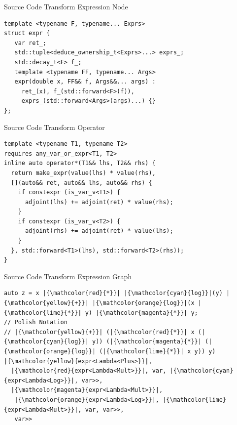 \documentclass[dvipsnames, aspectratio=169]{beamer}
\makeatletter
\def\mathcolor#1#{\@mathcolor{#1}}
\def\@mathcolor#1#2#3{%
  \protect\leavevmode
  \begingroup
    \color#1{#2}#3%
  \endgroup
}
\makeatother
\begin{document}
\begin{frame}[fragile]{Source Code Transform Expression Node}
\begin{verbatim}
template <typename F, typename... Exprs>
struct expr {
   var ret_;
   std::tuple<deduce_ownership_t<Exprs>...> exprs_;
   std::decay_t<F> f_;
   template <typename FF, typename... Args>
   expr(double x, FF&& f, Args&&... args) :
     ret_(x), f_(std::forward<F>(f)),
     exprs_(std::forward<Args>(args)...) {}
};
\end{verbatim}
\end{frame}

\begin{frame}[fragile]{Source Code Transform Operator}
\begin{verbatim}
template <typename T1, typename T2>
requires any_var_or_expr<T1, T2>
inline auto operator*(T1&& lhs, T2&& rhs) {
  return make_expr(value(lhs) * value(rhs),
  [](auto&& ret, auto&& lhs, auto&& rhs) {
    if constexpr (is_var_v<T1>) {
      adjoint(lhs) += adjoint(ret) * value(rhs);
    }
    if constexpr (is_var_v<T2>) {
      adjoint(rhs) += adjoint(ret) * value(lhs);
    }
  }, std::forward<T1>(lhs), std::forward<T2>(rhs));
}
\end{verbatim}
\end{frame}

\begin{frame}[fragile]{Source Code Transform Expression Graph}
\begin{verbatim}
auto z = x |{\mathcolor{red}{*}}| |{\mathcolor{cyan}{log}}|(y) |{\mathcolor{yellow}{+}}| |{\mathcolor{orange}{log}}|(x |{\mathcolor{lime}{*}}| y) |{\mathcolor{magenta}{*}}| y;
// Polish Notation
// |{\mathcolor{yellow}{+}}| (|{\mathcolor{red}{*}}| x (|{\mathcolor{cyan}{log}}| y)) (|{\mathcolor{magenta}{*}}| (|{\mathcolor{orange}{log}}| (|{\mathcolor{lime}{*}}| x y)) y)
|{\mathcolor{yellow}{expr<Lambda<Plus>}}|,
  |{\mathcolor{red}{expr<Lambda<Mult>}}|, var, |{\mathcolor{cyan}{expr<Lambda<Log>}}|, var>>,
  |{\mathcolor{magenta}{expr<Lambda<Mult>}}|,
   |{\mathcolor{orange}{expr<Lambda<Log>}}|, |{\mathcolor{lime}{expr<Lambda<Mult>}}|, var, var>>,
   var>>
\end{verbatim}
\end{frame}
\end{document}

